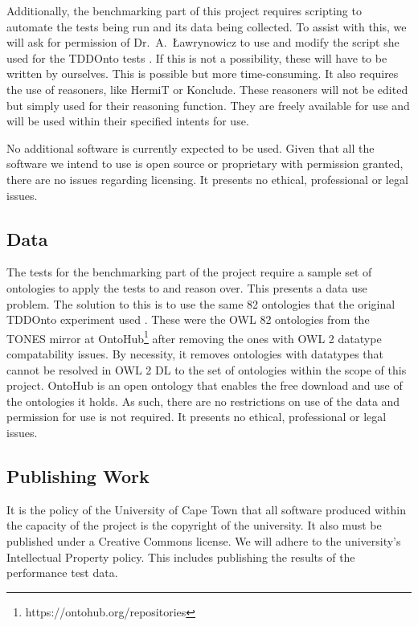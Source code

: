 \documentclass[draft]{sig-alternate}
\begin{document}
Additionally, the benchmarking part of this project requires scripting to automate the tests being run and its data being collected. To assist with this, we will ask for permission of Dr.\ A.\ {\L}awrynowicz to use and modify the script she used for the TDDOnto tests \cite{DBLP:conf/dlog/LawrynowiczK16}. If this is not a possibility, these will have to be written by ourselves. This is possible but more time-consuming. It also requires the use of reasoners, like HermiT or Konclude. These reasoners will not be edited but simply used for their reasoning function. They are freely available for use and will be used within their specified intents for use.

No additional software is currently expected to be used. Given that all the software we intend to use is open source or proprietary with permission granted, there are no issues regarding licensing. It presents no ethical, professional or legal issues.

\subsection{Data}

The tests for the benchmarking part of the project require a sample set of ontologies to apply the tests to and reason over. This presents a data use problem. The solution to this is to use the same 82 ontologies that the original TDDOnto experiment used \cite{DBLP:conf/dlog/LawrynowiczK16}. These were the OWL 82 ontologies from the TONES mirror at OntoHub\footnote{https://ontohub.org/repositories} after removing the ones with OWL 2 datatype compatability issues. By necessity, it removes ontologies with datatypes that cannot be resolved in OWL 2 DL to the set of ontologies within the scope of this project. OntoHub is an open ontology that enables the free download and use of the ontologies it holds. As such, there are no restrictions on use of the data and permission for use is not required. It presents no ethical, professional or legal issues.

\subsection{Publishing Work}

It is the policy of the University of Cape Town that all software produced within the capacity of the project is the copyright of the university. It also must be published under a Creative Commons license. We will adhere to the university's Intellectual Property policy. This includes publishing the results of the performance test data.
\end{document}
